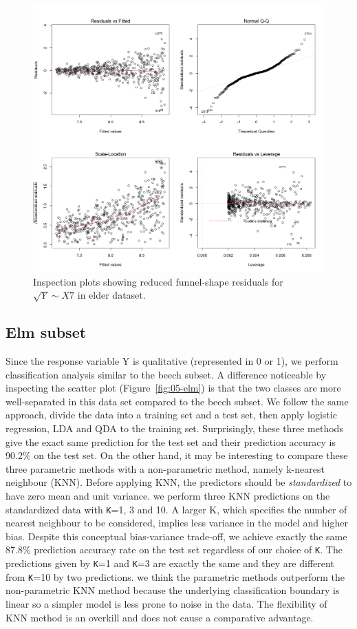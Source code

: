 \documentclass{article}
\begin{document}
\begin{figure}[h!]
  \includegraphics[width=\linewidth]{project/images/04-elder.png}
  \caption{Inspection plots showing reduced funnel-shape residuals for $\sqrt{Y} \sim X7$ in elder dataset.}
  \label{fig:04-elder}
\end{figure}

\subsection{Elm subset}

Since the response variable Y is qualitative (represented in 0 or 1), we perform classification analysis similar to the beech subset. A difference noticeable by inspecting the scatter plot (Figure~\ref{fig:05-elm}) is that the two classes are more well-separated in this data set compared to the beech subset. We follow the same approach, divide the data into a training set and a test set, then apply logistic regression, LDA and QDA to the training set. Surprisingly, these three methods give the exact same prediction for the test set and their prediction accuracy is 90.2\% on the test set. On the other hand, it may be interesting to compare these three parametric methods with a non-parametric method, namely k-nearest neighbour (KNN). Before applying KNN, the predictors should be {\em standardized} to have zero mean and unit variance. we perform three KNN predictions on the standardized data with {\tt K}=1, 3 and 10. A larger K, which specifies the number of nearest neighbour to be considered, implies less variance in the model and higher bias. Despite this conceptual bias-variance trade-off, we achieve exactly the same 87.8\% prediction accuracy rate on the test set regardless of our choice of {\tt K}. The predictions given by {\tt K}=1 and {\tt K}=3 are exactly the same and they are different from {\tt K}=10 by two predictions. we think the parametric methods outperform the non-parametric KNN method because the underlying classification boundary is linear so a simpler model is less prone to noise in the data. The flexibility of KNN method is an overkill and does not cause a comparative advantage.
\end{document}
